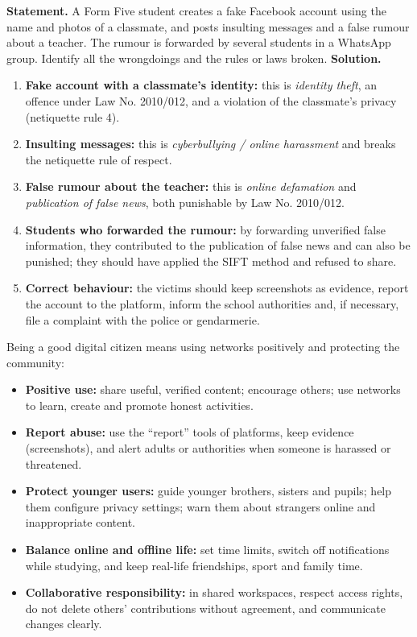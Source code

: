 \documentclass[11pt]{article}
\newcommand{\cle}[1]{{\popxbold\color{popdark}#1}}
\newcounter{popsec}
\newcounter{popsub}
\newcommand{\courssub}[1]{%
  \stepcounter{popsub}%
  \par\vspace{9pt}\noindent{\popxbold\fontsize{11.5}{13}\selectfont\color{popink}{\color{poporange}\thepopsec.\thepopsub}\hspace{6pt}#1}\par\nopagebreak\vspace{4pt}
}
\begin{document}
\begin{exoresolu}
\textbf{Statement.} A Form Five student creates a fake Facebook account using the name and photos of a classmate, and posts insulting messages and a false rumour about a teacher. The rumour is forwarded by several students in a WhatsApp group. Identify all the wrongdoings and the rules or laws broken.\tcblower
\textbf{Solution.}
\begin{enumerate}
\item \textbf{Fake account with a classmate's identity:} this is \emph{identity theft}, an offence under Law No. 2010/012, and a violation of the classmate's privacy (netiquette rule 4).
\item \textbf{Insulting messages:} this is \emph{cyberbullying / online harassment} and breaks the netiquette rule of respect.
\item \textbf{False rumour about the teacher:} this is \emph{online defamation} and \emph{publication of false news}, both punishable by Law No. 2010/012.
\item \textbf{Students who forwarded the rumour:} by forwarding unverified false information, they contributed to the publication of false news and can also be punished; they should have applied the SIFT method and refused to share.
\item \textbf{Correct behaviour:} the victims should keep screenshots as evidence, report the account to the platform, inform the school authorities and, if necessary, file a complaint with the police or gendarmerie.
\end{enumerate}
\end{exoresolu}

\courssub{Responsible digital citizenship}

Being a good \cle{digital citizen} means using networks positively and protecting the community:

\begin{itemize}
\item \textbf{Positive use:} share useful, verified content; encourage others; use networks to learn, create and promote honest activities.
\item \textbf{Report abuse:} use the ``report'' tools of platforms, keep evidence (screenshots), and alert adults or authorities when someone is harassed or threatened.
\item \textbf{Protect younger users:} guide younger brothers, sisters and pupils; help them configure privacy settings; warn them about strangers online and inappropriate content.
\item \textbf{Balance online and offline life:} set time limits, switch off notifications while studying, and keep real-life friendships, sport and family time.
\item \textbf{Collaborative responsibility:} in shared workspaces, respect access rights, do not delete others' contributions without agreement, and communicate changes clearly.
\end{itemize}
\end{document}

